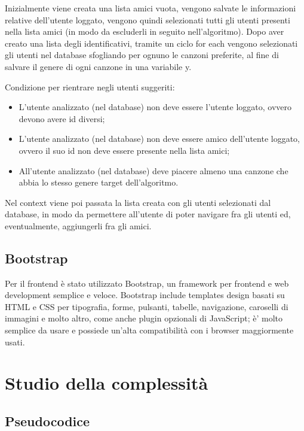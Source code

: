 Inizialmente viene creata una lista amici vuota, vengono salvate le informazioni relative dell'utente loggato, vengono quindi 
selezionati tutti gli utenti presenti nella lista amici (in modo da escluderli in seguito nell'algoritmo).
Dopo aver creato una lista degli identificativi, tramite un ciclo for each vengono selezionati gli utenti nel database 
sfogliando per ognuno le canzoni preferite, al fine di salvare il genere di ogni canzone in una variabile y.

Condizione per rientrare negli utenti suggeriti:
\begin{itemize}
    \item L'utente analizzato (nel database) non deve essere l'utente loggato, ovvero devono avere id diversi;
    \item L'utente analizzato (nel database) non deve essere amico dell'utente loggato, ovvero il suo id non deve essere presente 
    nella lista amici;
    \item All'utente analizzato (nel database) deve piacere almeno una canzone che abbia lo stesso genere target dell'algoritmo.

\end{itemize}

Nel context viene poi passata la lista creata con gli utenti selezionati dal database, in modo da permettere all'utente di poter
navigare fra gli utenti ed, eventualmente, aggiungerli fra gli amici. 

\subsection{Bootstrap}
Per il frontend è stato utilizzato Bootstrap, un framework per frontend e web development semplice e veloce. 
Bootstrap include templates design basati su HTML e CSS per tipografia, forme, pulsanti, tabelle, navigazione, caroselli di 
immagini e molto altro, come anche plugin opzionali di JavaScript; è' molto semplice da usare e possiede un'alta 
compatibilità con i browser maggiormente usati. 


\section{Studio della complessità}


\subsection{Pseudocodice}

